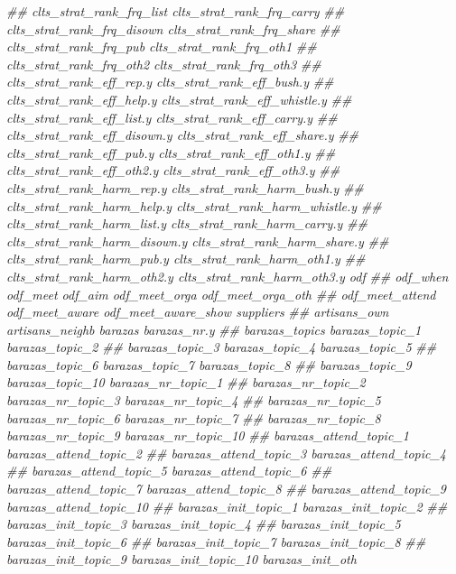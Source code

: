 \documentclass[
]{article}
\newenvironment{Shaded}{\begin{snugshade}}{\end{snugshade}}
\newcommand{\CommentTok}[1]{\textcolor[rgb]{0.56,0.35,0.01}{\textit{#1}}}
\begin{document}
\begin{Shaded}
\begin{Highlighting}[]
\CommentTok{##      clts_strat_rank_frq_list clts_strat_rank_frq_carry}
\CommentTok{##      clts_strat_rank_frq_disown clts_strat_rank_frq_share}
\CommentTok{##      clts_strat_rank_frq_pub clts_strat_rank_frq_oth1}
\CommentTok{##      clts_strat_rank_frq_oth2 clts_strat_rank_frq_oth3}
\CommentTok{##      clts_strat_rank_eff_rep.y clts_strat_rank_eff_bush.y}
\CommentTok{##      clts_strat_rank_eff_help.y clts_strat_rank_eff_whistle.y}
\CommentTok{##      clts_strat_rank_eff_list.y clts_strat_rank_eff_carry.y}
\CommentTok{##      clts_strat_rank_eff_disown.y clts_strat_rank_eff_share.y}
\CommentTok{##      clts_strat_rank_eff_pub.y clts_strat_rank_eff_oth1.y}
\CommentTok{##      clts_strat_rank_eff_oth2.y clts_strat_rank_eff_oth3.y}
\CommentTok{##      clts_strat_rank_harm_rep.y clts_strat_rank_harm_bush.y}
\CommentTok{##      clts_strat_rank_harm_help.y clts_strat_rank_harm_whistle.y}
\CommentTok{##      clts_strat_rank_harm_list.y clts_strat_rank_harm_carry.y}
\CommentTok{##      clts_strat_rank_harm_disown.y clts_strat_rank_harm_share.y}
\CommentTok{##      clts_strat_rank_harm_pub.y clts_strat_rank_harm_oth1.y}
\CommentTok{##      clts_strat_rank_harm_oth2.y clts_strat_rank_harm_oth3.y odf}
\CommentTok{##      odf_when odf_meet odf_aim odf_meet_orga odf_meet_orga_oth}
\CommentTok{##      odf_meet_attend odf_meet_aware odf_meet_aware_show suppliers}
\CommentTok{##      artisans_own artisans_neighb barazas barazas_nr.y}
\CommentTok{##      barazas_topics barazas_topic_1 barazas_topic_2}
\CommentTok{##      barazas_topic_3 barazas_topic_4 barazas_topic_5}
\CommentTok{##      barazas_topic_6 barazas_topic_7 barazas_topic_8}
\CommentTok{##      barazas_topic_9 barazas_topic_10 barazas_nr_topic_1}
\CommentTok{##      barazas_nr_topic_2 barazas_nr_topic_3 barazas_nr_topic_4}
\CommentTok{##      barazas_nr_topic_5 barazas_nr_topic_6 barazas_nr_topic_7}
\CommentTok{##      barazas_nr_topic_8 barazas_nr_topic_9 barazas_nr_topic_10}
\CommentTok{##      barazas_attend_topic_1 barazas_attend_topic_2}
\CommentTok{##      barazas_attend_topic_3 barazas_attend_topic_4}
\CommentTok{##      barazas_attend_topic_5 barazas_attend_topic_6}
\CommentTok{##      barazas_attend_topic_7 barazas_attend_topic_8}
\CommentTok{##      barazas_attend_topic_9 barazas_attend_topic_10}
\CommentTok{##      barazas_init_topic_1 barazas_init_topic_2}
\CommentTok{##      barazas_init_topic_3 barazas_init_topic_4}
\CommentTok{##      barazas_init_topic_5 barazas_init_topic_6}
\CommentTok{##      barazas_init_topic_7 barazas_init_topic_8}
\CommentTok{##      barazas_init_topic_9 barazas_init_topic_10 barazas_init_oth}

\end{Highlighting}
\end{Shaded}
\end{document}
